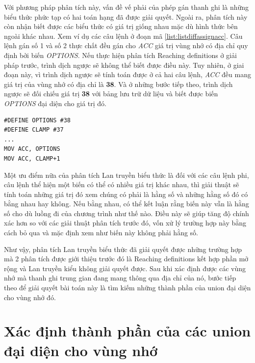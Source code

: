 Với phương pháp phân tích này, vấn đề vế phải của phép gán thanh ghi là những biểu thức phức tạp có hai toán hạng đã được giải quyết. Ngoài ra, phân tích này còn nhận biết được các biểu thức có giá trị giống nhau mặc dù hình thức bên ngoài khác nhau. Xem ví dụ các câu lệnh ở đoạn mã \ref{list:listdiffassignacc}. Câu lệnh gán số 1 và số 2 thực chất đều gán cho \textit{ACC} giá trị vùng nhớ có địa chỉ quy định bởi biến \textit{OPTIONS}. Nếu thực hiện phân tích Reaching definitions ở giải pháp trước, trình dịch ngược sẽ không thể biết được điều này. Tuy nhiên, ở giai đoạn này, vì trình dịch ngược sẽ tính toán được ở cả hai câu lệnh, \textit{ACC} đều mang giá trị của vùng nhớ có địa chỉ là \textbf{38}. Và ở những bước tiếp theo, trình dịch ngược sẽ đối chiếu giá trị \textbf{38} với bảng lưu trữ dữ liệu và biết được biến \textit{OPTIONS} đại diện cho giá trị đó.

\begin{lstlisting}[caption={Một số câu lệnh gán cho ACC có giá trị vế phải bằng nhau},label={list:listdiffassignacc}]
#DEFINE OPTIONS #38
#DEFINE CLAMP #37
...
MOV ACC, OPTIONS
MOV ACC, CLAMP+1
\end{lstlisting}

Một ưu điểm nữa của phân tích Lan truyền biểu thức là đối với các câu lệnh phi, câu lệnh thể hiện một biến có thể có nhiều giá trị khác nhau, thì giải thuật sẽ tính toán những giá trị đó xem chúng có phải là hằng số và những hằng số đó có bằng nhau hay không. Nếu bằng nhau, có thể kết luận rằng biến này vẫn là hằng số cho dù luồng đi của chương trình như thế nào. Điều này sẽ giúp tăng độ chính xác hơn so với các giải thuật phân tích trước đó, vốn xử lý trường hợp này bằng cách bỏ qua và mặc định xem như biến này không phải hằng số.

Như vậy, phân tích Lan truyền biểu thức đã giải quyết được những trường hợp mà 2 phân tích được giới thiệu trước đó là Reaching definitions kết hợp phần mở rộng và Lan truyền kiểu không giải quyết được. Sau khi xác định được các vùng nhớ mà thanh ghi trung gian đang mang thông qua địa chỉ của nó, bước tiếp theo để giải quyết bài toán này là tìm kiếm những thành phần của union đại diện cho vùng nhớ đó.
\section{Xác định thành phần của các union đại diện cho vùng nhớ}

